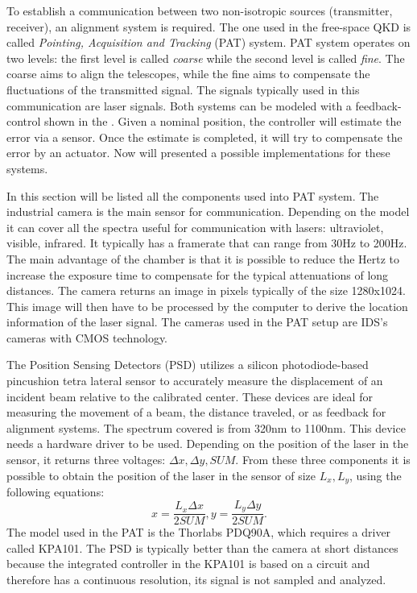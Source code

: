 To establish a communication between two non-isotropic sources (transmitter, receiver), an alignment system is required. The one used in the free-space QKD is called \textit{Pointing, Acquisition and Tracking} (PAT) system. PAT system operates on two levels: the first level is called \textit{coarse} while the second level is called \textit{fine}.
The coarse aims to align the telescopes, while the fine aims to compensate the fluctuations of the transmitted signal. The signals typically used in this communication are laser signals. Both systems can be modeled with a feedback-control shown in the .
Given a nominal position, the controller will estimate the error via a sensor. Once the estimate is completed, it will try to compensate the error by an actuator.
Now will presented a possible implementations for these systems.

In this section will be listed all the components used into PAT system.
The industrial camera is the main sensor for communication. Depending on the model it can cover all the spectra useful for communication with lasers: ultraviolet, visible, infrared.
It typically has a framerate that can range from 30Hz to 200Hz. The main advantage of the chamber is that it is possible to reduce the Hertz to increase the exposure time to compensate for the typical attenuations of long distances.
The camera returns an image in pixels typically of the size 1280x1024. This image will then have to be processed by the computer to derive the location information of the laser signal.
The cameras used in the PAT setup are IDS's cameras with CMOS technology.

The Position Sensing Detectors (PSD) utilizes a silicon photodiode-based pincushion tetra lateral sensor to accurately measure the displacement of an incident beam relative to the calibrated center. These devices are ideal for measuring the movement of a beam, the distance traveled, or as feedback for alignment systems.
The spectrum covered is from 320nm to 1100nm. This device needs a hardware driver to be used. Depending on the position of the laser in the sensor, it returns three voltages: $\Delta x, \Delta y, SUM$.
From these three components it is possible to obtain the position of the laser in the sensor of size $L_x,L_y$, using the following equations:
$$x = \frac{L_x \Delta x}{2 SUM}, y = \frac{L_y \Delta y}{2 SUM}.$$
The model used in the PAT is the Thorlabs PDQ90A, which requires a driver called KPA101.
The PSD is typically better than the camera at short distances because the integrated controller in the KPA101 is based on a circuit and therefore has a continuous resolution, its signal is not sampled and analyzed.

